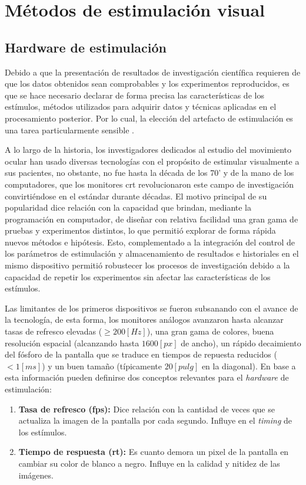 \documentclass[../Main.tex]{subfiles}
\begin{document}
	\section{Métodos de estimulación visual}
	\label{sec:02_sistemas_de_estimulacion_visual}
		\subsection{Hardware de estimulación}
		\label{sub:02_hardware_de_estimulacion}
			Debido a que la presentación de resultados de investigación científica requieren de que los datos obtenidos sean comprobables y los experimentos reproducidos, es que se hace necesario declarar de forma precisa las características de los estímulos, métodos utilizados para adquirir datos y técnicas aplicadas en el procesamiento posterior. Por lo cual, la elección del artefacto de estimulación es una tarea particularmente sensible \cite{article:monitor_beuer}.

			A lo largo de la historia, los investigadores dedicados al estudio del movimiento ocular han usado diversas tecnologías con el propósito de estimular visualmente a sus pacientes, no obstante, no fue hasta la década de los 70' y de la mano de los computadores, que los monitores \acrshort{crt} revolucionaron este campo de investigación convirtiéndose en el estándar durante décadas. El motivo principal de su popularidad dice relación con la capacidad que brindan, mediante la programación en computador, de diseñar con relativa facilidad una gran gama de pruebas y experimentos distintos, lo que permitió explorar de forma rápida nuevos métodos e hipótesis. Esto, complementado a la integración del control de los parámetros de estimulación y almacenamiento de resultados e historiales en el mismo dispositivo permitió robustecer los procesos de investigación debido a la capacidad de repetir los experimentos sin afectar las características de los estímulos. 

			Las limitantes de los primeros dispositivos se fueron subsanando con el avance de la tecnología, de esta forma, los monitores análogos avanzaron hasta alcanzar tasas de refresco elevadas ($\geq 200[Hz]$), una gran gama de colores, buena resolución espacial (alcanzando hasta $1600[px]$ de ancho), un rápido decaimiento del fósforo de la pantalla que se traduce en tiempos de repuesta reducidos ($< 1[ms]$) y un buen tamaño (típicamente $20[pulg]$ en la diagonal). En base a esta información pueden definirse dos conceptos relevantes para el \textit{hardware} de estimulación: 
			\begin{enumerate}\setlength\itemsep{-0.5em}
				\item \textbf{Tasa de refresco (\acrshort{fps}):} Dice relación con la cantidad de veces que se actualiza la imagen de la pantalla por cada segundo. Influye en el \textit{timing} de los estímulos.
				\item \textbf{Tiempo de respuesta (\acrshort{rt}):} Es cuanto demora un pixel de la pantalla en cambiar su color de blanco a negro. Influye en la calidad y nitidez de las imágenes. 
			\end{enumerate}
\end{document}
